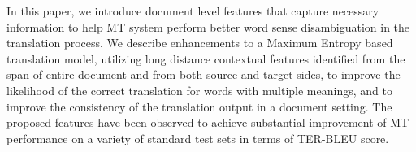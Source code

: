 In this paper, we introduce document level features that capture necessary information to help MT system perform better word sense disambiguation in the translation process. We describe enhancements to a Maximum Entropy based translation model, utilizing long distance contextual features identified from the span of entire document and from both source and target sides, to improve the likelihood of the correct translation for words with multiple meanings, and to improve the consistency of the translation output in a document setting. The proposed features have been observed to achieve substantial improvement of MT performance on a variety of standard test sets in terms of TER-BLEU score.
